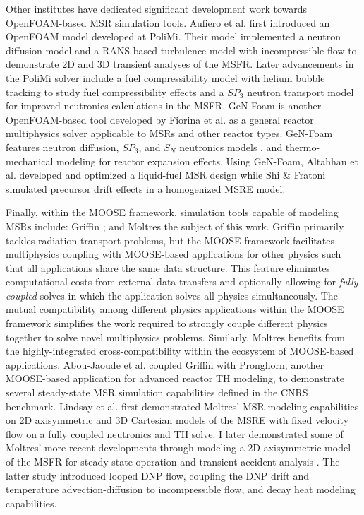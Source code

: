 Other institutes have dedicated significant development work towards
OpenFOAM-based \gls{MSR} simulation tools. Aufiero et al.
\cite{aufiero_development_2014} first introduced an OpenFOAM model developed
at \gls{PoliMi}. Their model implemented a neutron diffusion model and a
\gls{RANS}-based turbulence model with incompressible flow to demonstrate 2D
and 3D transient analyses of the \gls{MSFR}. Later advancements in the
\gls{PoliMi} solver include a fuel compressibility model with helium bubble
tracking to study fuel compressibility effects
\cite{cervi_development_2019} and a $SP_3$ neutron transport
model for improved neutronics calculations \cite{cervi_development_2019-1} in
the \gls{MSFR}. GeN-Foam is another OpenFOAM-based tool developed by Fiorina
et al. \cite{fiorina_gen-foam_2015} as a general reactor multiphysics solver
applicable to \glspl{MSR} and other reactor types. GeN-Foam features neutron
diffusion, $SP_3$, and $S_N$ neutronics models
\cite{fiorina_development_2016,fiorina_gen-foam_2015,fiorina_detailed_2019},
and thermo-mechanical modeling for reactor expansion effects. Using GeN-Foam,
Altahhan et al. \cite{altahhan_preliminary_2020} developed and optimized a
liquid-fuel \gls{MSR} design while Shi \& Fratoni \cite{shi_gen-foam_2021}
simulated precursor drift effects in a homogenized \gls{MSRE} model.

Finally, within the \gls{MOOSE} framework, simulation tools capable of modeling
\glspl{MSR} include: Griffin \cite{abou-jaoude_coupled_2020}; and Moltres
\cite{lindsay_moltres_2017}\textemdash the subject of this work.
Griffin primarily tackles radiation transport problems, but the \gls{MOOSE}
framework facilitates multiphysics coupling with \gls{MOOSE}-based applications for other physics
such that all applications share the same data structure. This feature eliminates
computational costs from external data transfers and optionally allowing for
\textit{fully coupled} solves in which the application solves all physics
simultaneously. The mutual compatibility among different physics applications within the
\gls{MOOSE} framework simplifies the work required to strongly couple
different physics together to solve novel multiphysics problems. Similarly,
Moltres benefits from the highly-integrated cross-compatibility
within the ecosystem of \gls{MOOSE}-based applications. Abou-Jaoude et al.
\cite{abou-jaoude_coupled_2020} coupled Griffin with Pronghorn, another
\gls{MOOSE}-based application for advanced reactor \gls{TH} modeling, to
demonstrate several steady-state \gls{MSR} simulation capabilities defined in
the CNRS benchmark. Lindsay et al.
\cite{lindsay_introduction_2018} first demonstrated Moltres' \gls{MSR} modeling
capabilities on 2D axisymmetric and 3D Cartesian models of the \gls{MSRE} with
fixed velocity flow on a fully coupled neutronics and \gls{TH} solve.
I later demonstrated some of Moltres' more recent developments through
modeling a 2D axisymmetric model of the \gls{MSFR} for steady-state operation
and transient accident analysis \cite{park_advancement_2020}. The latter study
introduced looped \gls{DNP} flow, coupling the \gls{DNP} drift and temperature 
advection-diffusion to incompressible flow, and decay heat modeling
capabilities.

